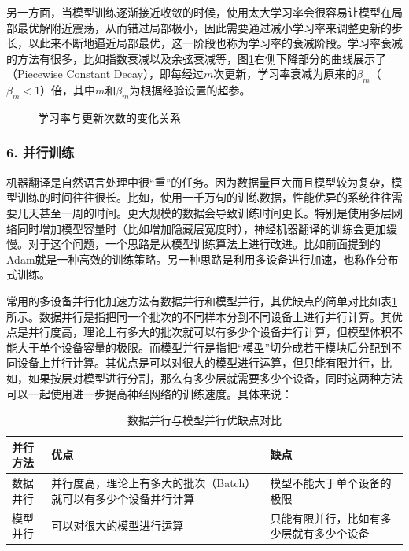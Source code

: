 \noindent 另一方面，当模型训练逐渐接近收敛的时候，使用太大学习率会很容易让模型在局部最优解附近震荡，从而错过局部极小，因此需要通过减小学习率来调整更新的步长，以此来不断地逼近局部最优，这一阶段也称为学习率的衰减阶段。学习率衰减的方法有很多，比如指数衰减以及余弦衰减等，图\ref{fig:10-26}右侧下降部分的曲线展示了{\small{}}（Piecewise Constant Decay），即每经过$m$次更新，学习率衰减为原来的$\beta_m$（$\beta_m<1$）倍，其中$m$和$\beta_m$为根据经验设置的超参。

\begin{figure}[htp]
\centering

\caption{学习率与更新次数的变化关系}
\label{fig:10-26}
\end{figure}

\subsubsection{6. 并行训练}

\parinterval 机器翻译是自然语言处理中很“重”的任务。因为数据量巨大而且模型较为复杂，模型训练的时间往往很长。比如，使用一千万句的训练数据，性能优异的系统往往需要几天甚至一周的时间。更大规模的数据会导致训练时间更长。特别是使用多层网络同时增加模型容量时（比如增加隐藏层宽度时），神经机器翻译的训练会更加缓慢。对于这个问题，一个思路是从模型训练算法上进行改进。比如前面提到的Adam就是一种高效的训练策略。另一种思路是利用多设备进行加速，也称作分布式训练。

\parinterval 常用的多设备并行化加速方法有数据并行和模型并行，其优缺点的简单对比如表\ref{tab:10-9}所示。数据并行是指把同一个批次的不同样本分到不同设备上进行并行计算。其优点是并行度高，理论上有多大的批次就可以有多少个设备并行计算，但模型体积不能大于单个设备容量的极限。而模型并行是指把“模型”切分成若干模块后分配到不同设备上并行计算。其优点是可以对很大的模型进行运算，但只能有限并行，比如，如果按层对模型进行分割，那么有多少层就需要多少个设备，同时这两种方法可以一起使用进一步提高神经网络的训练速度。具体来说：

\begin{table}[htp]
\centering
\caption{ 数据并行与模型并行优缺点对比}
\label{tab:10-9}
\begin{tabular}{l | p{12em}  p{12em} }
并行方法 &优点		&缺点 \\ \hline
\rule{0pt}{15pt}	数据并行 &并行度高，理论上有多大的批次（Batch）就可以有多少个设备并行计算	&模型不能大于单个设备的极限 \\
\rule{0pt}{15pt}	模型并行	&可以对很大的模型进行运算	&只能有限并行，比如有多少层就有多少个设备 \\
\end{tabular}
\end{table}


